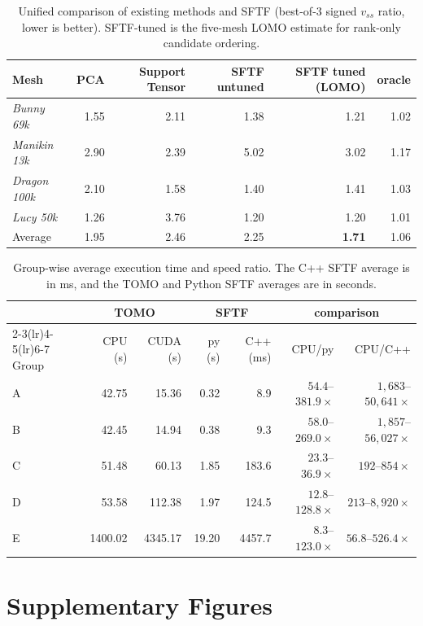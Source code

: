 \documentclass[11pt,a4paper]{article}
\begin{document}
\begin{table}[H]
\centering
\caption{Unified comparison of existing methods and SFTF (best-of-3 signed $v_{ss}$ ratio, lower is better).
SFTF-tuned is the five-mesh LOMO estimate for rank-only candidate ordering.}
\label{stab:unified}
\begin{tabular}{lrrrrr}
\toprule
Mesh & PCA & Support Tensor & SFTF untuned & SFTF tuned (LOMO) & oracle\\
\midrule
\emph{Bunny 69k}    & 1.55 & 2.11 & 1.38 & 1.21 & 1.02\\
\emph{Manikin 13k}  & 2.90 & 2.39 & 5.02 & 3.02 & 1.17\\
\emph{Dragon 100k}   & 2.10 & 1.58 & 1.40 & 1.41 & 1.03\\
\emph{Lucy 50k}     & 1.26 & 3.76 & 1.20 & 1.20 & 1.01\\
\midrule
Average     & 1.95 & 2.46 & 2.25 & \textbf{1.71} & 1.06\\
\bottomrule
\end{tabular}
\end{table}

\begin{table}[H]
\footnotesize
\centering
\caption{Group-wise average execution time and speed ratio.
The C++ SFTF average is in ms, and the TOMO and Python SFTF averages are in seconds.}
\label{stab:fivegroup-impl}
\begin{tabular}{lrrrrrr}
\toprule
& \multicolumn{2}{c}{TOMO} & \multicolumn{2}{c}{SFTF} & \multicolumn{2}{c}{comparison}\\
\cmidrule(lr){2-3}\cmidrule(lr){4-5}\cmidrule(lr){6-7}
Group & CPU (s) & CUDA (s) & py (s) & C++ (ms) & CPU/py & CPU/C++\\
\midrule
A & 42.75  & 15.36  & 0.32 & 8.9    & $54.4$--$381.9\times$   & $1{,}683$--$50{,}641\times$\\
B & 42.45  & 14.94  & 0.38 & 9.3    & $58.0$--$269.0\times$   & $1{,}857$--$56{,}027\times$\\
C & 51.48  & 60.13  & 1.85 & 183.6  & $23.3$--$36.9\times$   & $192$--$854\times$\\
D & 53.58  & 112.38 & 1.97 & 124.5  & $12.8$--$128.8\times$  & $213$--$8{,}920\times$\\
E & 1400.02 & 4345.17 & 19.20 & 4457.7 & $8.3$--$123.0\times$    & $56.8$--$526.4\times$\\
\bottomrule
\end{tabular}
\end{table}

\section*{Supplementary Figures}
\end{document}
